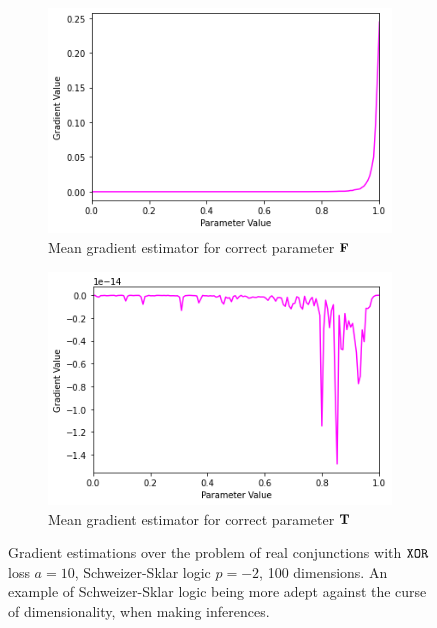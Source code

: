 \begin{figure}[ht]
\begin{subfigure}[b]{0.47\textwidth}
        \includegraphics[width=\textwidth]{imgs/grad_ss_10_falseparam_100dim_avg.png}
        \caption{Mean gradient estimator for correct parameter $\textbf{F}$}
        \label{fig:conjgrad10falseavgss100}
    \end{subfigure}
    \begin{subfigure}[b]{0.47\textwidth}
        \centering
        \includegraphics[width=\textwidth]{imgs/grad_ss_10_trueparam_100dim_avg.png}
        \caption{Mean gradient estimator for correct parameter $\textbf{T}$}
        \label{fig:conjgrad10trueavgss100}
    \end{subfigure}
       \caption{Gradient estimations over the problem of real conjunctions with $\texttt{XOR}$ loss $a=10$, Schweizer-Sklar logic $p=-2$, 100 dimensions. An example of Schweizer-Sklar logic being more adept against the curse of dimensionality, when making inferences.}
       \label{fig:conjgrad10ss100}
\end{figure}


